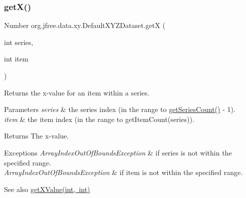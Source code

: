 \mbox{\label{classorg_1_1jfree_1_1data_1_1xy_1_1_default_x_y_z_dataset_a46a17db4f8c6013a1ff779529478c221}} 
\subsubsection{\texorpdfstring{get\+X()}{getX()}}
{\footnotesize\ttfamily Number org.\+jfree.\+data.\+xy.\+Default\+X\+Y\+Z\+Dataset.\+getX (\begin{DoxyParamCaption}\item[{int}]{series,  }\item[{int}]{item }\end{DoxyParamCaption})}

Returns the x-\/value for an item within a series.


\begin{DoxyParams}{Parameters}
{\em series} & the series index (in the range {} to {\ttfamily \mbox{\hyperlink{classorg_1_1jfree_1_1data_1_1xy_1_1_default_x_y_z_dataset_a115138a06afdc19d3526ef73fabf578e}{get\+Series\+Count()}} -\/ 1}). \\
\hline
{\em item} & the item index (in the range {} to {\ttfamily get\+Item\+Count(series)}).\\
\hline
\end{DoxyParams}
\begin{DoxyReturn}{Returns}
The x-\/value.
\end{DoxyReturn}

\begin{DoxyExceptions}{Exceptions}
{\em Array\+Index\+Out\+Of\+Bounds\+Exception} & if {\ttfamily series} is not within the specified range. \\
\hline
{\em Array\+Index\+Out\+Of\+Bounds\+Exception} & if {\ttfamily item} is not within the specified range.\\
\hline
\end{DoxyExceptions}
\begin{DoxySeeAlso}{See also}
\mbox{\hyperlink{classorg_1_1jfree_1_1data_1_1xy_1_1_default_x_y_z_dataset_a595c9b15046e75687ad4cc5f7b6a4617}{get\+X\+Value(int, int)}} 
\end{DoxySeeAlso}



